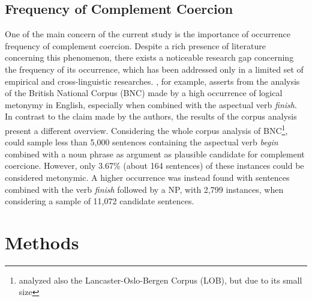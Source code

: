 \documentclass{article}
\begin{document}
\subsection{Frequency of Complement Coercion} %
One of the main concern of the current study is the importance of occurrence frequency of complement coercion. 
Despite a rich presence of literature concerning this phenomenon, there exists a noticeable research gap concerning the frequency of its occurrence, which has been addressed only in a limited set of empirical and cross-linguistic researches. \textcite{shutova_logical_2009}, for example, asserts from the analysis of the British National Corpus (BNC) made by \textcite{verspoor_conventionality-governed_1997} a high occurrence of logical metonymy in English, especially when combined with the aspectual verb \emph{finish}. In contrast to the claim made by the authors, the results of the corpus analysis present a different overview. Considering the whole corpus analysis of BNC\footnote{\textcite{verspoor_conventionality-governed_1997} analyzed also the Lancaster-Oslo-Bergen Corpus (LOB), but due to its small size},  
\textcite{verspoor_conventionality-governed_1997} could sample less than 5,000 sentences containing the aspectual verb \emph{begin} combined with a noun phrase as argument as plausible candidate for complement coercione. However, only 3.67\% (about 164 sentences) of these instances could be considered metonymic. A higher occurrence was instead found with sentences combined with the verb \emph{finish} followed by a NP, with 2,799 instances, when considering a sample of 11,072 candidate sentences. %

\section{Methods}
\end{document}

